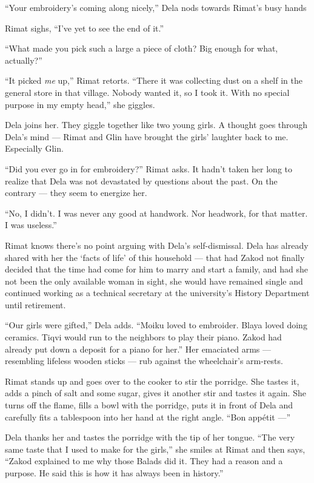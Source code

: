 \documentclass[twoside,11pt,openany]{book}
\begin{document}
``Your embroidery's coming along nicely,'' Dela nods towards Rimat's busy hands

Rimat sighs, ``I've yet to see the end of it.''

``What made you pick such a large a piece of cloth?  Big enough for what, actually?''

``It picked \textit{me} up,'' Rimat retorts. ``There it was collecting dust on a
shelf in the general store in that village. Nobody wanted it, so I took it. With no special purpose in my empty
head,'' she giggles.

Dela joins her. They giggle together like two young girls. A thought goes through Dela's mind ---  Rimat and Glin have
brought the girls{'} laughter back to me. Especially Glin.

``Did you ever go in for embroidery?'' Rimat asks. It hadn't taken her long to realize that
Dela was not devastated by questions about the past. On the contrary --- they seem to energize her.

``No, I didn't. I was never any good at handwork. Nor headwork, for that matter. I was
useless.''

Rimat knows there's no point arguing with Dela's self-dismissal. Dela has already shared with her the `facts of life' of
this household ---  that had Zakod not finally decided that the time had come for him to marry and start a family, and
had she not been the only available woman in sight, she would have remained single and continued working as a technical
secretary at the university's History Department until retirement.

``Our girls were gifted,'' Dela adds. ``Moiku loved to embroider. Blaya loved
doing ceramics. Tiqvi would run to the neighbors to play their piano. Zakod had already put down a deposit for a piano
for her.''  Her emaciated arms --- resembling lifeless wooden sticks --- rub against the wheelchair's
arm-rests.

Rimat stands up and goes over to the cooker to stir the porridge. She tastes it, adds a pinch of salt and some sugar,
gives it another stir and tastes it again. She turns off the flame, fills a bowl with the porridge, puts it in front of
Dela and carefully fits a tablespoon into her hand at the right angle. ``Bon app\'etit ---''


Dela thanks her and tastes the porridge with the tip of her tongue. ``The very same taste that I used to
make for the girls,'' she smiles at Rimat and then says, ``Zakod explained to me why those
Balads did it. They had a reason and a purpose. He said this is how it has always been in history.''
\end{document}
